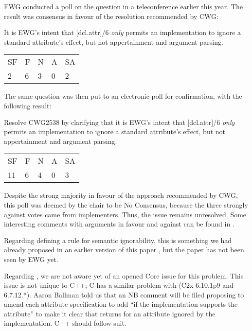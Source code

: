 EWG conducted a poll on the question in a teleconference earlier this year. The result was consensus in favour of the resolution recommended by CWG:

\begin{adjustwidth}{0.5cm}{0.5cm}
It is EWG's intent that [dcl.attr]/6 \emph{only} permits an implementation to ignore a standard attribute's effect, but not appertainment and argument parsing.

\begin{tabular}{lllll}
SF & F & N & A & SA \\
2 & 6 & 3 & 0 & 2
\end{tabular}
\end{adjustwidth}

The same question was then put to an electronic poll for confirmation, with the following result:

\begin{adjustwidth}{0.5cm}{0.5cm}
Resolve CWG2538 by clarifying that it is EWG’s intent that [dcl.attr]/6 \emph{only} permits an implementation to ignore a standard attribute’s effect, but not appertainment and argument parsing.

\begin{tabular}{lllll}
SF & F & N & A & SA \\
11 & 6 & 4 & 0 & 3
\end{tabular}
\end{adjustwidth}

Despite the strong majority in favour of the approach recommended by CWG, this poll was deemed by the chair to be No Consensus, because the three strongly against votes came from implementers. Thus, the issue remains unresolved. Some interesting comments with arguments in favour and against can be found in \cite{P1018R17}.

Regarding defining a rule for semantic ignorability, this is something we had already proposed in an earlier version of this paper \cite{P2552R0}, but the paper has not been seen by EWG yet.

Regarding , we are not aware yet of an opened Core issue for this problem. This issue is not unique to C++; C has a similar problem with  (C2x 6.10.1p9 and 6.7.12.*). Aaron Ballman told us that an NB comment will be filed proposing to amend each attribute specification to add ``if the implementation supports the attribute'' to make it clear that  returns  for an attribute ignored by the implementation. C++ should follow suit.

